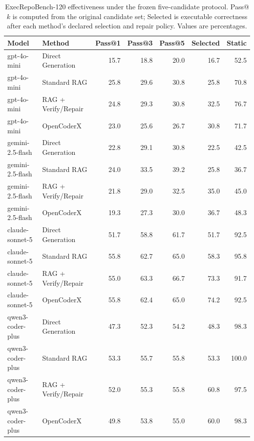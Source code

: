 \begin{table}[t]
\centering
\small
\caption{ExecRepoBench-120 effectiveness under the frozen five-candidate protocol. Pass@$k$ is computed from the original candidate set; Selected is executable correctness after each method's declared selection and repair policy. Values are percentages.}
\label{tab:exec120_effectiveness}
\begin{tabular}{llrrrrr}
\toprule
Model & Method & Pass@1 & Pass@3 & Pass@5 & Selected & Static \\
\midrule
gpt-4o-mini & Direct Generation & 15.7 & 18.8 & 20.0 & 16.7 & 52.5 \\
gpt-4o-mini & Standard RAG & 25.8 & 29.6 & 30.8 & 25.8 & 70.8 \\
gpt-4o-mini & RAG + Verify/Repair & 24.8 & 29.3 & 30.8 & 32.5 & 76.7 \\
gpt-4o-mini & OpenCoderX & 23.0 & 25.6 & 26.7 & 30.8 & 71.7 \\
\midrule
gemini-2.5-flash & Direct Generation & 22.8 & 29.1 & 30.8 & 22.5 & 42.5 \\
gemini-2.5-flash & Standard RAG & 24.0 & 33.5 & 39.2 & 25.8 & 36.7 \\
gemini-2.5-flash & RAG + Verify/Repair & 21.8 & 29.0 & 32.5 & 35.0 & 45.0 \\
gemini-2.5-flash & OpenCoderX & 19.3 & 27.3 & 30.0 & 36.7 & 48.3 \\
\midrule
claude-sonnet-5 & Direct Generation & 51.7 & 58.8 & 61.7 & 51.7 & 92.5 \\
claude-sonnet-5 & Standard RAG & 55.8 & 62.7 & 65.0 & 58.3 & 95.8 \\
claude-sonnet-5 & RAG + Verify/Repair & 55.0 & 63.3 & 66.7 & 73.3 & 91.7 \\
claude-sonnet-5 & OpenCoderX & 55.8 & 62.4 & 65.0 & 74.2 & 92.5 \\
\midrule
qwen3-coder-plus & Direct Generation & 47.3 & 52.3 & 54.2 & 48.3 & 98.3 \\
qwen3-coder-plus & Standard RAG & 53.3 & 55.7 & 55.8 & 53.3 & 100.0 \\
qwen3-coder-plus & RAG + Verify/Repair & 52.0 & 55.3 & 55.8 & 60.8 & 97.5 \\
qwen3-coder-plus & OpenCoderX & 49.8 & 53.8 & 55.0 & 60.0 & 98.3 \\
\bottomrule
\end{tabular}
\end{table}
